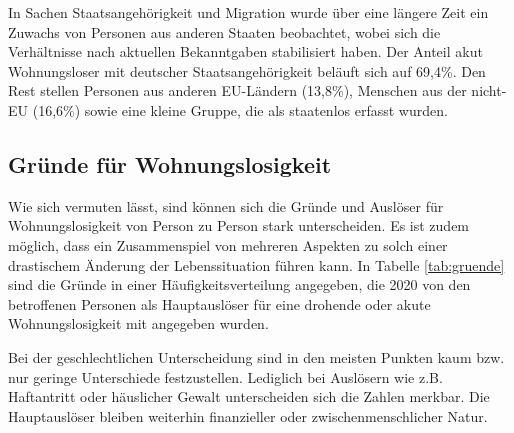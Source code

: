 In Sachen Staatsangehörigkeit und Migration wurde über eine längere Zeit ein Zuwachs von Personen aus anderen Staaten beobachtet, wobei sich die Verhältnisse nach aktuellen Bekanntgaben stabilisiert haben. Der Anteil akut Wohnungsloser mit deutscher Staatsangehörigkeit beläuft sich auf 69,4\%. Den Rest stellen Personen aus anderen EU-Ländern (13,8\%), Menschen aus der nicht-EU (16,6\%) sowie eine kleine Gruppe, die als staatenlos erfasst wurden.

\subsection{Gründe für Wohnungslosigkeit}

Wie sich vermuten lässt, sind können sich die Gründe und Auslöser für Wohnungslosigkeit von Person zu Person stark unterscheiden. Es ist zudem möglich, dass ein Zusammenspiel von mehreren Aspekten zu solch einer drastischem Änderung der Lebenssituation führen kann. In Tabelle \ref{tab:gruende} sind die Gründe in einer Häufigkeitsverteilung angegeben, die 2020 von den betroffenen Personen als Hauptauslöser für eine drohende oder akute Wohnungslosigkeit mit angegeben wurden.

Bei der geschlechtlichen Unterscheidung sind in den meisten Punkten kaum bzw. nur geringe Unterschiede festzustellen. Lediglich bei Auslösern wie z.B. Haftantritt oder häuslicher Gewalt unterscheiden sich die Zahlen merkbar. Die Hauptauslöser bleiben weiterhin finanzieller oder zwischenmenschlicher Natur.

